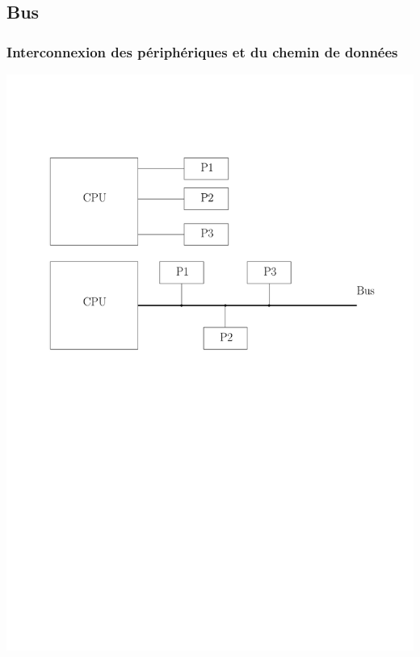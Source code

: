 \documentclass{beamer}
\begin{document}
\subsection{Bus}

\begin{frame}

\frametitle{Interconnexion des périphériques et du chemin de données}

\includegraphics[width=\linewidth]{Figs/bus.pdf}

\end{frame}
\end{document}
